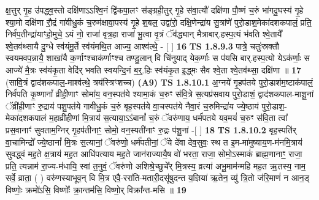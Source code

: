 \documentclass[17pt]{extarticle}
\begin{document}
                  क्ष॒त्तुर् गृ॒ह उ॑पद्ध्व॒स्तो दक्षि॑णाऽऽश्वि॒नं द्वि॑कपा॒लꣳ स॑ङ्ग्रही॒तुर् गृ॒हे स॑वा॒त्यौ॑ दक्षि॑णा पौ॒ष्णं च॒रुं भा॑गदु॒घस्य॑ गृ॒हे श्या॒मो दक्षि॑णा रौ॒द्रं गा॑वीधु॒कं च॒रुम॑क्षावा॒पस्य॑ गृ॒हे श॒बल॒ उद्वा॑रो॒ दक्षि॒णेन्द्रा॑य सु॒त्रांणे॑ पुरो॒डाश॒मेका॑दशकपालं॒ प्रति॒ निर्व॑प॒तीन्द्रा॑याꣳहो॒मुचे॒ ऽयं नो॒ राजा॑ वृत्र॒हा राजा॑ भू॒त्वा वृ॒त्रं ॅव॑द्ध्यान् मैत्राबार्.हस्प॒त्यं भ॑वति श्वे॒तायै᳚ श्वे॒तव॑थ्सायै दु॒ग्धे स्व॑यंमू॒र्ते स्व॑यंमथि॒त आज्य॒ आश्व॑त्थे॒ - [ ] \textbf{  16} \newline
                  \newline
                                \textbf{ TS 1.8.9.3} \newline
                  पात्रे॒ चतुः॑स्रक्तौ स्वयमवप॒न्नायै॒ शाखा॑यै क॒र्णाꣳश्चाक॑र्णाꣳश्च तण्डु॒लान् वि चि॑नुयाद् येक॒र्णाः स प॑यसि बार्.हस्प॒त्यो येऽक॑र्णाः॒ स आज्ये॑ मै॒त्रः स्व॑यंकृ॒ता वेदि॑र् भवति स्वयन्दि॒॒नं ब॒र्॒.हिः स्व॑यंकृ॒त इ॒द्ध्मः सैव श्वे॒ता श्वे॒तव॑थ्सा॒ दक्षि॑णा ॥ \textbf{  17} \newline
                  \newline
                      (सावि॒त्रं द्वाद॑शकपाल॒-माश्व॑त्थे॒ त्रय॑स्त्रिꣳशच्च)  \textbf{(A9)} \newline \newline
                                        \textbf{ TS 1.8.10.1} \newline
                  अ॒ग्नये॑ गृ॒हप॑तये पुरो॒डाश॑म॒ष्टाक॑पालं॒ निर्व॑पति कृ॒ष्णानां᳚ व्रीही॒णाꣳ सोमा॑य॒ वन॒स्पत॑ये श्यामा॒कं च॒रुꣳ स॑वि॒त्रे स॒त्यप्र॑सवाय पुरो॒डाशं॒ द्वाद॑शकपाल-माशू॒नां ॅव्री॑ही॒णाꣳ रु॒द्राय॑ पशु॒पत॑ये गावीधु॒कं च॒रुं बृह॒स्पत॑ये वा॒चस्पत॑ये नैवा॒रं च॒रुमिन्द्रा॑य ज्ये॒ष्ठाय॑ पुरो॒डाश॒-मेका॑दशकपालं म॒हाव्री॑हीणां मि॒त्राय॑ स॒त्याया॒ऽऽंबानां᳚ च॒रुं ॅवरु॑णाय॒ धर्म॑पतये यव॒मयं॑ च॒रुꣳ स॑वि॒ता त्वा᳚ प्रस॒वानाꣳ॑ सुवताम॒ग्निर् गृ॒हप॑तीनाꣳ॒॒ सोमो॒ वन॒स्पती॑नाꣳ रु॒द्रः प॑शू॒नां -[ ] \textbf{  18} \newline
                  \newline
                                \textbf{ TS 1.8.10.2} \newline
                  बृह॒स्पति॑र् वा॒चामिन्द्रो᳚ ज्ये॒ष्ठानां᳚ मि॒त्रः स॒त्यानां॒ ॅवरु॑णो॒ धर्म॑पतीनां॒ ॅये दे॑वा देव॒सुवः॒ स्थ त इ॒म-मा॑मुष्याय॒ण-म॑नमि॒त्राय॑ सुवद्ध्वं मह॒ते क्ष॒त्राय॑ मह॒त आधि॑पत्याय मह॒ते जान॑राज्यायै॒ष वो॑ भरता॒ राजा॒ सोमो॒ऽस्माकं॑ ब्राह्म॒णानाꣳ॒॒ राजा॒ प्रति॒ त्यन्नाम॑ रा॒ज्य-म॑धायि॒ स्वां त॒नुवं॒ ॅवरु॑णो अशिश्रे॒च्छुचे᳚र् मि॒त्रस्य॒ व्रत्या॑ अभू॒माम॑न्महि मह॒त ऋ॒तस्य॒ नाम॒ सर्वे॒ व्राता॒ ( ) वरु॑णस्याभूव॒न् वि मि॒त्र एवै॒-ररा॑ति-मतारी॒दसू॑षुदन्त य॒ज्ञिया॑ ऋ॒तेन॒ व्यु॑ त्रि॒तो ज॑रि॒माणं॑ न आन॒ड् विष्णोः॒ क्रमो॑ऽसि॒ विष्णोः᳚ क्रा॒न्तम॑सि॒ विष्णो॒र् विक्रा᳚न्त-मसि ॥ \textbf{  19} \newline
\end{document}
